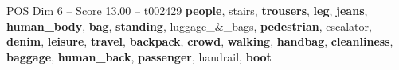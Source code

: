\begin{textsample}{POS Dim 6 – Score 13.00 – t002429}  \label{ex:f6_pos_014}
\textbf{people}, stairs, \textbf{trousers}, \textbf{leg}, \textbf{jeans}, \textbf{human\_body}, \textbf{bag}, \textbf{standing}, luggage\_\&\_bags, \textbf{pedestrian}, escalator, \textbf{denim}, \textbf{leisure}, \textbf{travel}, \textbf{backpack}, \textbf{crowd}, \textbf{walking}, \textbf{handbag}, \textbf{cleanliness}, \textbf{baggage}, \textbf{human\_back}, \textbf{passenger}, handrail, \textbf{boot}

\end{textsample}
